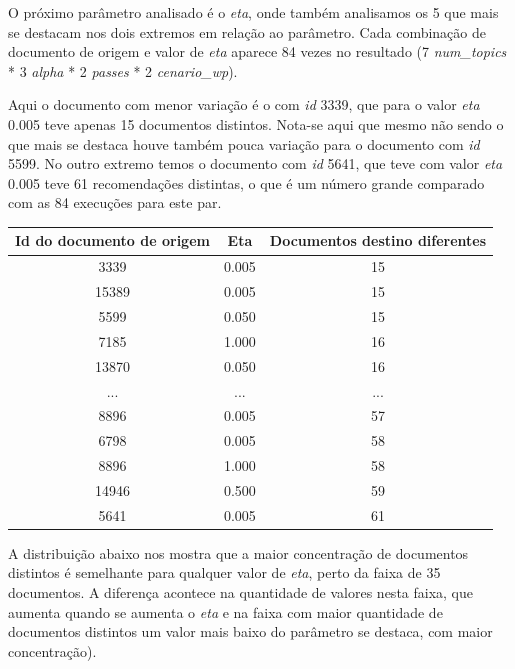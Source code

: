 O próximo parâmetro analisado é o \textit{eta}, onde também analisamos os 5 que mais se destacam nos dois extremos em relação ao parâmetro.
Cada combinação de documento de origem e valor de \textit{eta} aparece 84 vezes no resultado (7 \textit{num\_topics} * 3 \textit{alpha} * 2 \textit{passes} * 2 \textit{cenario\_wp}).

Aqui o documento com menor variação é o com \textit{id} 3339, que para o valor \textit{eta} 0.005 teve apenas 15 documentos distintos. Nota-se aqui
que mesmo não sendo o que mais se destaca houve também pouca variação para o documento com \textit{id} 5599.
No outro extremo temos o documento com \textit{id} 5641, que teve com valor \textit{eta} 0.005 teve 61 recomendações distintas, o que é um número 
grande comparado com as 84 execuções para este par.

\begin{center}
    \begin{tabular}{|c|c|c|}
        \hline
        Id do documento de origem & Eta & Documentos destino diferentes \\
        \hline
        3339 & 0.005 & 15 \\
        \hline
        15389 & 0.005 & 15 \\
        \hline
        5599 & 0.050 & 15 \\
        \hline
        7185 & 1.000 & 16 \\
        \hline
        13870 & 0.050 & 16 \\
        \hline
        ... & ... & ... \\
        \hline
        8896 & 0.005 & 57 \\
        \hline
        6798 & 0.005 & 58 \\
        \hline
        8896 & 1.000 & 58 \\
        \hline
        14946 & 0.500 & 59 \\
        \hline
        5641 & 0.005 & 61 \\
        \hline
    \end{tabular}
\end{center}

A distribuição abaixo nos mostra que a maior concentração de documentos distintos é semelhante para qualquer valor de \textit{eta}, perto da faixa de 
35 documentos. A diferença acontece na quantidade de valores nesta faixa, que aumenta quando se aumenta o \textit{eta} e na faixa com maior 
quantidade de documentos distintos um valor mais baixo do parâmetro se destaca, com maior concentração).

